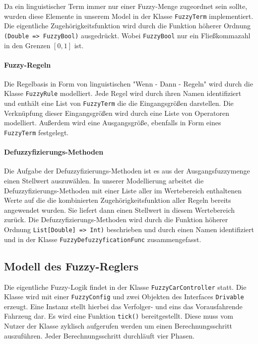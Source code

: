 \documentclass[12pt,a4paper,bibliography=totocnumbered,listof=totocnumbered, abstracton]{scrartcl}
\def\code#1{\texttt{#1}}
\theoremstyle{Umgebung}
\begin{document}
Da ein linguistischer Term immer nur einer Fuzzy-Menge zugeordnet sein sollte, wurden diese Elemente in unserem Model in der Klasse \code{FuzzyTerm} implementiert. Die eigentliche Zugehörigkeitsfunktion wird durch die Funktion höherer Ordnung \code{(Double => FuzzyBool)} ausgedrückt. Wobei \code{FuzzyBool} nur ein Fließkommazahl in den Grenzen $\left[0,1\right]$ ist.

\paragraph{Fuzzy-Regeln}

Die Regelbasis in Form von linguistischen "Wenn - Dann - Regeln" wird durch die Klasse \code{FuzzyRule} modelliert. Jede Regel wird durch ihren Namen identifiziert und enthält eine List von \code{FuzzyTerm} die die Eingangsgrößen darstellen. Die Verknüpfung dieser Eingangsgrößen wird durch eine Liste von Operatoren modelliert. Außerdem wird eine Ausgangsgröße, ebenfalls in Form eines \code{FuzzyTerm} festgelegt.

\paragraph{Defuzzyfizierungs-Methoden}

Die Aufgabe der Defuzzyfizierungs-Methoden ist es aus der Ausgangsfuzzymenge einen Stellwert auszuwählen. In unserer Modellierung arbeitet die Defuzzyfizierungs-Methoden mit einer Liste aller im Wertebereich enthaltenen Werte auf die die kombinierten Zugehörigkeitsfunktion aller Regeln bereits angewendet wurden. Sie liefert dann einen Stellwert in diesem Wertebereich zurück. Die Defuzzyfizierungs-Methoden wird durch die Funktion höherer Ordnung \code{List[Double] => Int)} beschrieben und durch einen Namen identifiziert und in der Klasse \code{FuzzyDefuzzyficationFunc} zusammengefasst.

\subsection{Modell des Fuzzy-Reglers}

Die eigentliche Fuzzy-Logik findet in der Klasse \code{FuzzyCarController} statt. Die Klasse wird mit einer \code{FuzzyConfig} und zwei Objekten des Interfaces \code{Drivable} erzeugt. Eine Instanz stellt hierbei das Verfolger- und eins das Vorausfahrende Fahrzeug dar. Es wird eine Funktion \code{tick()} bereitgestellt. Diese muss vom Nutzer der Klasse zyklisch aufgerufen werden um einen Berechnungsschritt auszuführen. Jeder Berechnungsschritt durchläuft vier Phasen.
\end{document}
